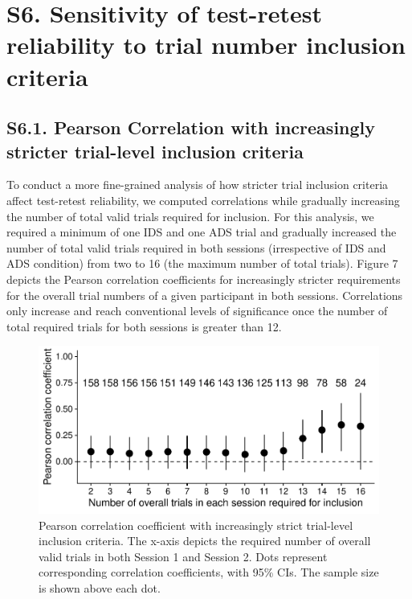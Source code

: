 \documentclass[
  english,
  man, donotrepeattitle,floatsintext]{apa6}
\begin{document}
\newpage

\hypertarget{s6.-sensitivity-of-test-retest-reliability-to-trial-number-inclusion-criteria}{%
\section{S6. Sensitivity of test-retest reliability to trial number inclusion criteria}\label{s6.-sensitivity-of-test-retest-reliability-to-trial-number-inclusion-criteria}}

\hypertarget{s6.1.-pearson-correlation-with-increasingly-stricter-trial-level-inclusion-criteria}{%
\subsection{S6.1. Pearson Correlation with increasingly stricter trial-level inclusion criteria}\label{s6.1.-pearson-correlation-with-increasingly-stricter-trial-level-inclusion-criteria}}

To conduct a more fine-grained analysis of how stricter trial inclusion criteria affect test-retest reliability, we computed correlations while gradually increasing the number of total valid trials required for inclusion.
For this analysis, we required a minimum of one IDS and one ADS trial and gradually increased the number of total valid trials required in both sessions (irrespective of IDS and ADS condition) from two to 16 (the maximum number of total trials).
Figure 7 depicts the Pearson correlation coefficients for increasingly stricter requirements for the overall trial numbers of a given participant in both sessions.
Correlations only increase and reach conventional levels of significance once the number of total required trials for both sessions is greater than 12.

\begin{figure}
\centering
\includegraphics{MB1T_supplement_files/figure-latex/fig7-1.pdf}
\caption{\label{fig:fig7}Pearson correlation coefficient with increasingly strict trial-level inclusion criteria. The x-axis depicts the required number of overall valid trials in both Session 1 and Session 2. Dots represent corresponding correlation coefficients, with 95\% CIs. The sample size is shown above each dot.}
\end{figure}
\end{document}
